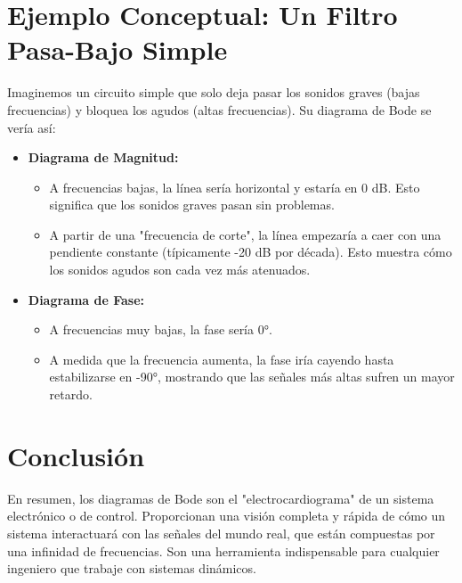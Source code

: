 \documentclass[12pt, a4paper]{article}
\begin{document}
\section{Ejemplo Conceptual: Un Filtro Pasa-Bajo Simple}
Imaginemos un circuito simple que solo deja pasar los sonidos graves (bajas frecuencias) y bloquea los agudos (altas frecuencias). Su diagrama de Bode se vería así:

\begin{itemize}
    \item \textbf{Diagrama de Magnitud:}
    \begin{itemize}
        \item A frecuencias bajas, la línea sería horizontal y estaría en 0 dB. Esto significa que los sonidos graves pasan sin problemas.
        \item A partir de una "frecuencia de corte", la línea empezaría a caer con una pendiente constante (típicamente -20 dB por década). Esto muestra cómo los sonidos agudos son cada vez más atenuados.
    \end{itemize}
    \item \textbf{Diagrama de Fase:}
    \begin{itemize}
        \item A frecuencias muy bajas, la fase sería 0°.
        \item A medida que la frecuencia aumenta, la fase iría cayendo hasta estabilizarse en -90°, mostrando que las señales más altas sufren un mayor retardo.
    \end{itemize}
\end{itemize}

\section{Conclusión}
En resumen, los diagramas de Bode son el "electrocardiograma" de un sistema electrónico o de control. Proporcionan una visión completa y rápida de cómo un sistema interactuará con las señales del mundo real, que están compuestas por una infinidad de frecuencias. Son una herramienta indispensable para cualquier ingeniero que trabaje con sistemas dinámicos.
\end{document}
